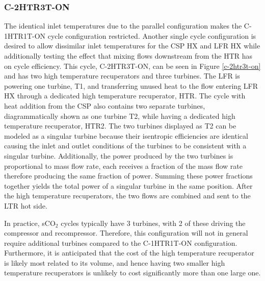\begin{paracol}{2}
\linenumbers
\switchcolumn

\subsubsection{C-2HTR3T-ON} 

The identical inlet temperatures due to the parallel configuration makes the C-1HTR1T-ON cycle configuration restricted. Another single cycle configuration is desired to allow dissimilar inlet temperatures for the CSP HX and LFR HX while additionally testing the effect that mixing flows downstream from the HTR has on cycle efficiency. This cycle, C-2HTR3T-ON, can be seen in Figure \ref{c-2htr3t-on} and has two high temperature recuperators and three turbines. The LFR is powering one turbine, T1, and transferring unused heat to the flow entering LFR HX through a dedicated high temperature recuperator, HTR. The cycle with heat addition from the CSP also contains two separate turbines, diagrammatically shown as one turbine T2, while having a dedicated high temperature recuperator, HTR2. The two turbines displayed as T2 can be modeled as a singular turbine because their isentropic efficiencies are identical causing the inlet and outlet conditions of the turbines to be consistent with a singular turbine. Additionally, the power produced by the two turbines is proportional to mass flow rate, each receives a fraction of the mass flow rate therefore producing the same fraction of power. Summing these power fractions together yields the total power of a singular turbine in the same position. 
After the high temperature recuperators, the two flows are combined and sent to the LTR hot side. 

In practice, sCO$_2$ cycles typically have 3 turbines, with 2 of these driving the compressor and recompressor. Therefore, this configuration will not in general require additional turbines compared to the C-1HTR1T-ON configuration. Furthermore, it is anticipated that the cost of the high temperature recuperator is likely most related to its volume, and hence having two smaller high temperature recuperators is unlikely to cost significantly more than one large one. 

\end{paracol}
